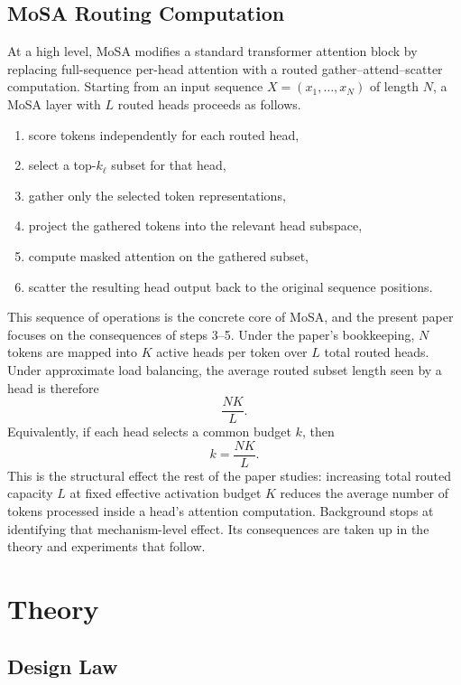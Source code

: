\documentclass[11pt]{article}
\begin{document}
\subsection{MoSA Routing Computation}

At a high level, MoSA modifies a standard transformer attention block by replacing full-sequence per-head attention with a routed gather--attend--scatter computation. Starting from an input sequence $X = (x_1, \dots, x_N)$ of length $N$, a MoSA layer with $L$ routed heads proceeds as follows.

\begin{enumerate}[leftmargin=2em]
    \item score tokens independently for each routed head,
    \item select a top-$k_\ell$ subset for that head,
    \item gather only the selected token representations,
    \item project the gathered tokens into the relevant head subspace,
    \item compute masked attention on the gathered subset,
    \item scatter the resulting head output back to the original sequence positions.
\end{enumerate}

This sequence of operations is the concrete core of MoSA, and the present paper focuses on the consequences of steps 3--5. Under the paper's bookkeeping, $N$ tokens are mapped into $K$ active heads per token over $L$ total routed heads. Under approximate load balancing, the average routed subset length seen by a head is therefore
\[
\frac{NK}{L}.
\]
Equivalently, if each head selects a common budget $k$, then
\[
k = \frac{NK}{L}.
\]
This is the structural effect the rest of the paper studies: increasing total routed capacity $L$ at fixed effective activation budget $K$ reduces the average number of tokens processed inside a head's attention computation. Background stops at identifying that mechanism-level effect. Its consequences are taken up in the theory and experiments that follow.

\section{Theory}
\label{sec:theory}

\subsection{Design Law}
\end{document}
